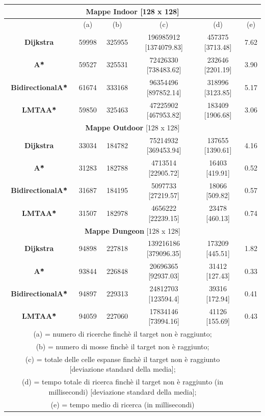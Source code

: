 \documentclass[12pt]{book}
\begin{document}
{\begin{table}[H]
{\begin{tabular}{c|c|c|c|c|c|}
\hline
\multicolumn{6}{c}{\textbf{Mappe Indoor} [128 x 128]}\\
\hline 
	 & (a) & (b) & (c) & (d) & (e)\\
\hline
	\textbf{Dijkstra} & 59998 & 325955 & 196985912 [1374079.83] & 457375 [3713.48] & 7.62\\
\hline
	\textbf{A\^*} & 59527 & 325531 & 72426330 [738483.62] & 232646 [2201.19] & 3.90\\
\hline
	\textbf{BidirectionalA\^*} & 61674 & 333168 & 96354496 [897852.14] & 318996 [3123.85]& 5.17\\
\hline
	\textbf{LMTAA\^*} & 59850 & 325463 & 47225902 [467953.82] & 183409 [1906.68] & 3.06\\ \hline 
	\multicolumn{6}{c}{\textbf{Mappe Outdoor} [128 x 128]}\\
\hline
	\textbf{Dijkstra} & 33034 & 184782 & 75214932 [369453.94] & 137655 [1390.61] & 4.16\\
\hline
	\textbf{A\^*} & 31283 & 182788 & 4713514 [22905.72] & 16403 [419.91] & 0.52\\
\hline
	\textbf{BidirectionalA\^*} & 31687 & 184195 & 5097733 [27219.57] & 18066 [509.82]& 0.57\\
\hline
	\textbf{LMTAA\^*} & 31507 & 182978 & 4656222 [22239.15] & 23478 [460.13] & 0.74\\ \hline 
		\multicolumn{6}{c}{\textbf{Mappe Dungeon} [128 x 128]}\\
\hline
	\textbf{Dijkstra} & 94898 & 227818 & 139216186 [379096.35] & 173209 [445.51] & 1.82\\
\hline
	\textbf{A\^*} & 93844 & 226848 & 20696365 [92937.03] & 31412 [127.43] & 0.33\\
\hline
	\textbf{BidirectionalA\^*} & 94897 & 229313 & 24812703 [123594.4] & 39316 [172.94]& 0.41\\
\hline
	\textbf{LMTAA\^*} & 94059 & 227060 & 17834146 [73994.16] & 41126 [155.69] & 0.43\\ \hline 
			\multicolumn{5}{c}{(a) = numero di ricerche finch\`e il target non \`e raggiunto;} \\ \multicolumn{5}{c}{(b) = numero di mosse finch\`e il target non \`e raggiunto;} \\ \multicolumn{5}{c}{(c) = totale delle celle espanse finch\`e  il target non \`e raggiunto [deviazione standard della media];} \\ \multicolumn{5}{c}{(d) = tempo totale di ricerca finch\`e il target non \`e raggiunto (in millisecondi) [deviazione standard della media];} \\ \multicolumn{5}{c}{(e) = tempo medio di ricerca (in millisecondi) }\\


\end{tabular}}
\end{table}}
\end{document}
